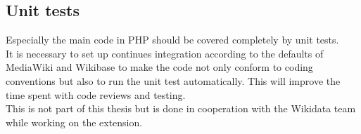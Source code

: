 \subsection {Unit tests}
Especially the main code in PHP should be covered completely by unit tests.\\
It is necessary to set up continues integration according to the defaults of MediaWiki and Wikibase to make the code not only conform to coding conventions but also to run the unit test automatically. This will improve the time spent with code reviews and testing. \\
This is not part of this thesis but is done in cooperation with the Wikidata team while working on the extension.